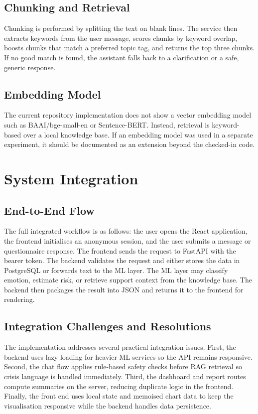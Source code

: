 \subsection{Chunking and Retrieval}

Chunking is performed by splitting the text on blank lines. The service then extracts keywords from the user message, scores chunks by keyword overlap, boosts chunks that match a preferred topic tag, and returns the top three chunks. If no good match is found, the assistant falls back to a clarification or a safe, generic response.

\subsection{Embedding Model}

The current repository implementation does not show a vector embedding model such as BAAI/bge-small-en or Sentence-BERT. Instead, retrieval is keyword-based over a local knowledge base. If an embedding model was used in a separate experiment, it should be documented as an extension beyond the checked-in code.

\section{System Integration}

\subsection{End-to-End Flow}

The full integrated workflow is as follows: the user opens the React application, the frontend initialises an anonymous session, and the user submits a message or questionnaire response. The frontend sends the request to FastAPI with the bearer token. The backend validates the request and either stores the data in PostgreSQL or forwards text to the ML layer. The ML layer may classify emotion, estimate risk, or retrieve support context from the knowledge base. The backend then packages the result into JSON and returns it to the frontend for rendering.

\subsection{Integration Challenges and Resolutions}

The implementation addresses several practical integration issues. First, the backend uses lazy loading for heavier ML services so the API remains responsive. Second, the chat flow applies rule-based safety checks before RAG retrieval so crisis language is handled immediately. Third, the dashboard and report routes compute summaries on the server, reducing duplicate logic in the frontend. Finally, the front end uses local state and memoised chart data to keep the visualisation responsive while the backend handles data persistence.

